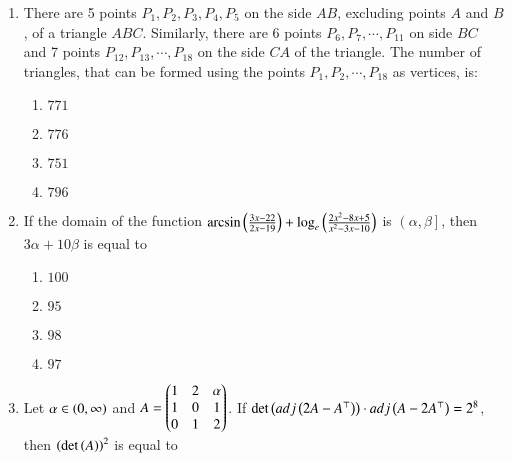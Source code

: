 \documentclass[journal]{IEEEtran}
\begin{document}
\begin{enumerate}
        \begin{multicols}{4}
            \begin{enumerate}
                \item $165$
                \item $150$
                \item $160$
                \item $155$
            \end{enumerate}
        \end{multicols}
		
    \item There are 5 points $P_1,P_2,P_3,P_4,P_5$ on the side $AB$, excluding points $A$ and $B$, of a triangle $ABC$. Similarly, there are 6 points $P_6,P_7,\cdots,P_{11}$ on side $BC$ and 7 points $P_{12},P_{13},\cdots,P_{18}$ on the side $CA$ of the triangle. The number of triangles, that can be formed using the points $P_1,P_2,\cdots,P_{18}$ as vertices, is:

        \begin{multicols}{4}
            \begin{enumerate}
                \item $771$
                \item $776$
                \item $751$
                \item $796$
            \end{enumerate}
        \end{multicols}

    \item If the domain of the function $\arcsin\left(\frac{3x-22}{2x-19}\right)+\log_e\left(\frac{2x^2-8x+5}{x^2-3x-10}\right)$ is $\left(\alpha,\beta\right]$, then $3\alpha+10\beta$ is equal to

        \begin{multicols}{4}
            \begin{enumerate}
                \item $100$
                \item $95$
                \item $98$
                \item $97$
            \end{enumerate}
        \end{multicols}

    \item Let $\alpha\in\left(0,\infty\right)$ and $A=\begin{pmatrix}1 & 2 & \alpha \\ 1 & 0 & 1 \\ 0 & 1 & 2\end{pmatrix}$. If $\det\left(adj\left(2A-A^\top\right)\right)\cdot adj\left(A-2A^\top\right)=2^8$, then $\left(\det\left(A\right)\right)^2$ is equal to


\end{enumerate}
\end{document}
